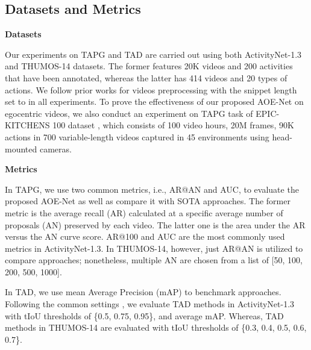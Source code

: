 \documentclass[sn-mathphys]{sn-jnl}
\theoremstyle{thmstyleone}\newtheorem{theorem}{Theorem}\newtheorem{proposition}[theorem]{Proposition}
\theoremstyle{thmstyletwo}\newtheorem{example}{Example}\newtheorem{remark}{Remark}
\theoremstyle{thmstylethree}\newtheorem{definition}{Definition}
\begin{document}
\subsection{Datasets and Metrics}
\noindent
\textbf{Datasets}

\noindent
Our experiments on TAPG and TAD are carried out using both ActivityNet-1.3 \cite{caba2015activitynet} and THUMOS-14 \cite{THUMOS14} datasets. The former features 20K videos and 200 activities that have been annotated, whereas the latter has 414 videos and 20 types of actions. We follow prior works \cite{lin2018bsn,bmn, dbg} for videos preprocessing with the snippet length set to  in all experiments. To prove the effectiveness of our proposed AOE-Net on egocentric videos, we also conduct an experiment on TAPG task of EPIC-KITCHENS 100 dataset \cite{damen2021rescaling}, which consists of 100 video hours, 20M frames, 90K actions in 700 variable-length videos captured in 45 environments using head-mounted cameras.
 
\vspace{2mm}
\noindent\textbf{Metrics}

\noindent In TAPG, we use two common metrics, i.e., AR@AN and AUC, to evaluate the proposed AOE-Net as well as compare it with SOTA approaches. The former metric is the average recall (AR) calculated at a specific average number of proposals (AN) preserved by each video. The latter one is the area under the AR versus the AN curve score. AR@100 and AUC are the most commonly used metrics in ActivityNet-1.3. In THUMOS-14, however, just AR@AN is utilized to compare approaches; nonetheless, multiple AN are chosen from a list of [50, 100, 200, 500, 1000].

In TAD, we use mean Average Precision (mAP) to benchmark approaches. Following the common settings \cite{lin2018bsn, dbg, bmn, tsi_accv, MR_eccv2020}, we evaluate TAD methods in ActivityNet-1.3 with tIoU thresholds of \{0.5, 0.75, 0.95\}, and average mAP. Whereas, TAD methods in THUMOS-14 are evaluated with tIoU thresholds of \{0.3, 0.4, 0.5, 0.6, 0.7\}.
\end{document}
